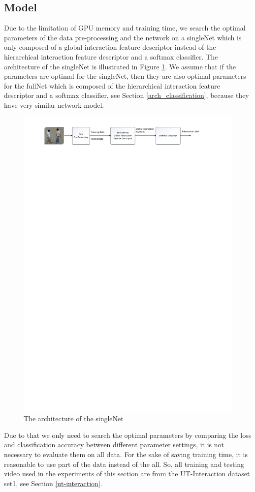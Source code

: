 \subsection{Model}
\label{tuning_network}
Due to the limitation of GPU memory and training time, we search the optimal parameters of the data pre-processing and the network on a singleNet which is only composed of a global interaction feature descriptor instead of the hierarchical interaction feature descriptor and a softmax classifier. The architecture of the singleNet is illustrated in Figure \ref{fig:arch_eval}. We assume that if the parameters are optimal for the singleNet, then they are also optimal parameters for the fullNet which is composed of the hierarchical interaction feature descriptor and a softmax classifier, see Section \ref{arch_classification},  because they have very similar network model.  
 \begin{figure}
 	\includegraphics[trim=2cm 26.5cm 0cm 1cm]{fig01/arch_eval.pdf}
 	\caption{The architecture of the singleNet}
 	\label{fig:arch_eval}
 \end{figure}
Due to that we only need to search the optimal parameters by comparing the loss and classification accuracy between different parameter settings, it is not necessary to evaluate them on all data. For the sake of saving training time, it is reasonable to use part of the data instead of the all. So, all training and testing video used in the experiments of this section are from the UT-Interaction dataset set1, see Section \ref{ut-interaction}.  


